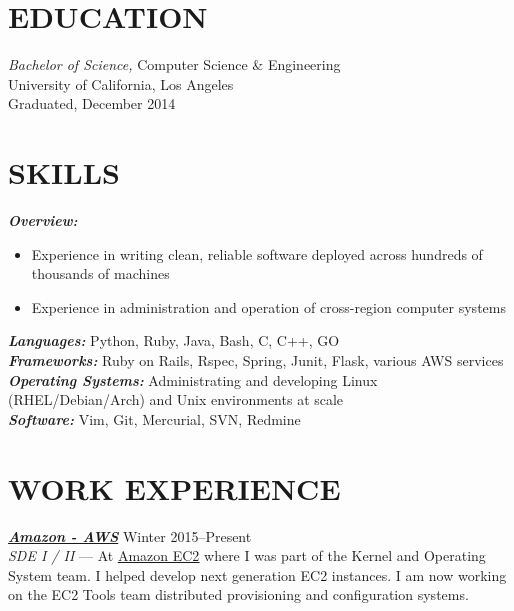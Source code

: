 \documentclass[line,letterpaper]{resume}
\begin{document}
\address{\ }
\address{\ }


\begin{resume}
    \vspace{-24pt}
    \section{\uppercase{Education}} {\sl Bachelor of Science,} \/
    Computer Science \& Engineering \\
    University of California, Los Angeles\\
    Graduated, December 2014 \\

    \vspace{-16pt}

 \section{\uppercase{Skills}}
    {\sl\textbf{Overview:}}\/
	\begin{itemize}
		\item Experience in writing clean, reliable software deployed across hundreds of thousands of machines
		\item Experience in administration and operation of cross-region computer systems
	\end{itemize}
    {\sl\textbf{Languages:}}\/
    Python, Ruby, Java, Bash, C, C++, GO \\
    {\sl\textbf{Frameworks:}}\/
	Ruby on Rails, Rspec, Spring, Junit, Flask, various AWS services\\
    {\sl\textbf{Operating Systems:}}\/
	Administrating and developing Linux (RHEL/Debian/Arch) and Unix environments at scale\\
    {\sl\textbf{Software:}}\/
	Vim, Git, Mercurial, SVN, Redmine
    \vspace{-6pt}

	\section{\uppercase{Work Experience}}

	{\sl\textbf{\href{https://aws.amazon.com/}{Amazon - AWS}}} \hfill Winter 2015--Present\\
    \emph{SDE I / II } --- At \underline{\href{http://aws.amazon.com/ec2}
	{Amazon EC2}} where I was part of the Kernel and Operating System team. I helped
	develop next generation EC2 instances. I am now working on the EC2 Tools team
    distributed provisioning and configuration systems.


\end{resume}
\end{document}
